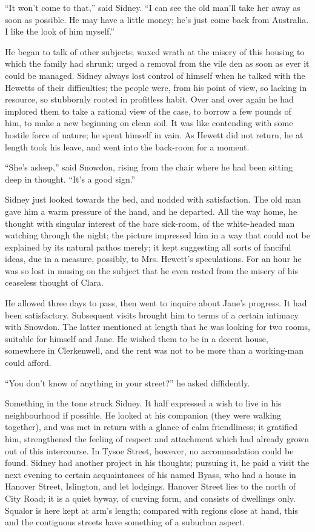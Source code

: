``It won't come to that,'' said Sidney. ``I can see the old man'll take
her away as soon as possible. He may have a little money; he's just come
back from Australia. I like the look of him myself.''

He began to talk of other subjects; waxed wrath at the misery of this
housing to which the family had shrunk; urged a removal from the vile
den as soon as ever it could be managed. Sidney always lost control of
himself when he talked with the Hewetts of their difficulties; the
people were, from his point of view, so lacking in resource, so
stubbornly rooted in profitless habit. Over and over again he had
implored them to take a rational view of the case, to borrow a few
pounds of him, to make a new beginning on clean soil. {}It was like
contending with some hostile force of nature; he spent himself in vain.
As Hewett did not return, he at length took his leave, and went into the
back-room for a moment.

``She's asleep,'' said Snowdon, rising from the chair where he had been
sitting deep in thought. ``It's a good sign.''

Sidney just looked towards the bed, and nodded with satisfaction. The
old man gave him a warm pressure of the hand, and he departed. All the
way home, he thought with singular interest of the bare sick-room, of
the white-headed man watching through the night; the picture impressed
him in a way that could not be explained by its natural pathos merely;
it kept suggesting all sorts of fanciful ideas, due in a measure,
possibly, to Mrs. Hewett's speculations. For an hour he was so lost in
musing on the subject that he even rested from the misery of his
ceaseless thought of Clara.

He allowed three days to pass, then went to inquire about Jane's
progress. It had been {}satisfactory. Subsequent visits brought him to
terms of a certain intimacy with Snowdon. The latter mentioned at length
that he was looking for two rooms, suitable for himself and Jane. He
wished them to be in a decent house, somewhere in Clerkenwell, and the
rent was not to be more than a working-man could afford.

``You don't know of anything in your street?'' he asked diffidently.

Something in the tone struck Sidney. It half expressed a wish to live in
his neighbourhood if possible. He looked at his companion (they were
walking together), and was met in return with a glance of calm
friendliness; it gratified him, strengthened the feeling of respect and
attachment which had already grown out of this intercourse. In Tysoe
Street, however, no accommodation could be found. Sidney had another
project in his thoughts; pursuing it, he paid a visit the next evening
to certain acquaintances of his named Byass, who had a house in Hanover
Street, Islington, and let lodgings. Hanover Street {}lies to the north
of City Road; it is a quiet byway, of curving form, and consists of
dwellings only. Squalor is here kept at arm's length; compared with
regions close at hand, this and the contiguous streets have something of
a suburban aspect.

